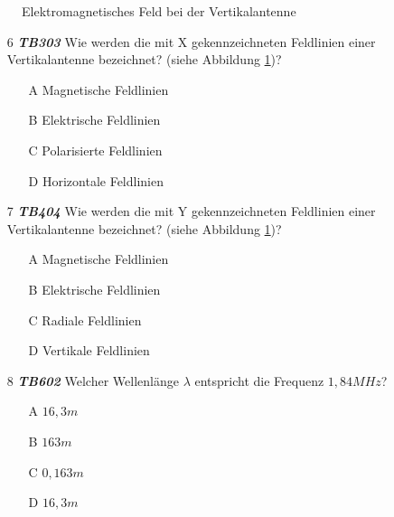 \begin{figure}[H]
\centering

\caption{Elektromagnetisches Feld bei der Vertikalantenne}
\label{AntSchwingkreis_02}
\end{figure}

\begin{enumerate} 
\itemsep1pt\parskip0pt
\item[6] \emph{\textbf{TB303}} Wie werden die mit X gekennzeichneten Feldlinien einer Vertikalantenne bezeichnet? (siehe Abbildung \ref{AntSchwingkreis_02})?
	\begin{enumerate}
	\itemsep1pt\parskip0pt
		\item[A] Magnetische Feldlinien
		\item[B] Elektrische Feldlinien
		\item[C] Polarisierte Feldlinien
		\item[D] Horizontale Feldlinien
	\end{enumerate}
\end{enumerate}


\begin{enumerate} 
\itemsep1pt\parskip0pt
\item[7] \emph{\textbf{TB404}} Wie werden die mit Y gekennzeichneten Feldlinien einer Vertikalantenne bezeichnet? (siehe Abbildung \ref{AntSchwingkreis_02})?
	\begin{enumerate}
	\itemsep1pt\parskip0pt
		\item[A] Magnetische Feldlinien
		\item[B] Elektrische Feldlinien
		\item[C] Radiale Feldlinien
		\item[D] Vertikale Feldlinien
	\end{enumerate}
\end{enumerate}

\begin{enumerate} 
\itemsep1pt\parskip0pt
\item[8] \emph{\textbf{TB602}} Welcher Wellenlänge $\lambda$ entspricht die Frequenz $1,84 MHz$?
	\begin{enumerate}
	\itemsep1pt\parskip0pt
		\item[A] $16,3m$
		\item[B] $163m$
		\item[C] $0,163m$
		\item[D] $16,3m$
	\end{enumerate}
\end{enumerate}